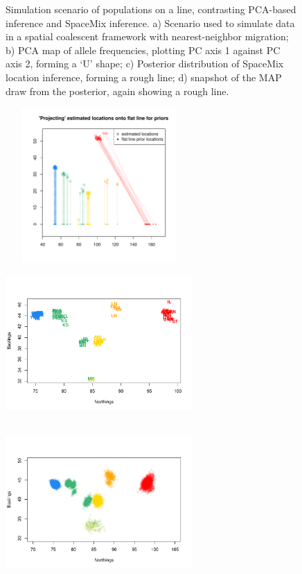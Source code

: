 \documentclass[12pt]{article}
\begin{document}
\begin{figure}
	\caption{Simulation scenario of populations on a line, contrasting PCA-based inference and SpaceMix inference. a) Scenario used to simulate data in a spatial coalescent framework with nearest-neighbor migration; b) PCA map of allele frequencies, plotting PC axis 1 against PC axis 2, forming a `U' shape; c) Posterior distribution of SpaceMix location inference, forming a rough line; d) snapshot of the MAP draw from the posterior, again showing a rough line.}
	\label{sfig:line_scenario}
\end{figure}

\begin{figure}
	\centering
			{\includegraphics[width=2.8in,height=2.33in]{figs/warblers/warb_inds_on_a_line_setup.pdf}}
			{\includegraphics[width=2.8in,height=2.33in]{figs/warblers/warb_inds_on_a_line_MAP1.pdf}}
			{\includegraphics[width=2.8in,height=2.33in]{figs/warblers/warb_inds_on_a_line_post1.pdf}}

\end{figure}
\end{document}
